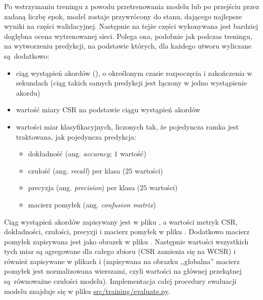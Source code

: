 Po wstrzymaniu treningu z powodu przetrenowania modelu lub po przejściu przez zadaną liczbę epok,
model zostaje przywrócony do stanu, dającego najlepsze wyniki na części walidacyjnej. Następnie na
tejże części wykonywana jest bardziej dogłębna ocena wytrenowanej sieci. Polega ona, podobnie jak
podczas treningu, na wytworzeniu predykcji, na podstawie których, dla każdego utworu wyliczane
są dodatkowo: 
\begin{itemize}
    \item ciąg wystąpień akordów (), o określonym czasie rozpoczęcia i
        zakończenia w sekundach (ciąg takich samych predykcji jest łączony w jedno wystąpienie
        akordu)
    \item wartość miary CSR na podstawie ciągu wystąpień akordów
    \item wartości miar klasyfikacyjnych, liczonych tak, że pojedyncza ramka jest traktowana, jak
        pojedyncza predykcja:
        \begin{itemize}
            \item dokładność (ang. \emph{accuracy}; $1$ wartość)
            \item czułość (ang. \emph{recall}) per klasa ($25$ wartości)
            \item precyzja (ang. \emph{precision}) per klasa ($25$ wartości)
            \item macierz pomyłek (ang. \emph{confusion matrix})
        \end{itemize}
\end{itemize}
Ciąg wystąpień akordów zapisywany jest w pliku , a wartości metryk CSR, dokładności,
czułości, precyzji i macierz pomyłek w pliku . Dodatkowo macierz pomyłek zapisywana
jest jako obrazek w pliku . Następnie wartości wszystkich tych miar są agregowane dla
całego zbioru (CSR zamienia się na WCSR) i również zapisywane w plikach  i
 (zapisywana na obrazku ,,globalna'' macierz pomyłek jest normalizowana wierszami,
czyli wartości na głównej przekątnej są równoważne czułości modelu). Implementacja całej procedury
ewaluacji modelu znajduje się w pliku \url{src/training/evaluate.py}.

